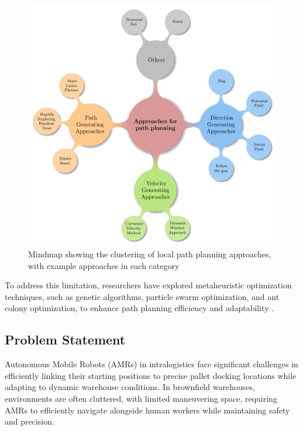 \documentclass{amam}                %
\begin{document}
\begin{figure}
  \centering \includegraphics[width=1.0\linewidth]{eps/Mindmap-OAApproaches.pdf}
  \caption{Mindmap showing the clustering of local path planning approaches, with example approaches in each category}
  \label{mindmap}
\end{figure}








To address this limitation, researchers have explored metaheuristic optimization techniques, such as genetic 
algorithms, particle swarm optimization, and ant colony optimization, to enhance path planning efficiency and adaptability \cite{ref1}.

\subsection{Problem Statement}
Autonomous Mobile Robots (AMRs) in intralogistics face significant challenges in efficiently linking their starting positions to precise pallet docking locations while adapting to dynamic warehouse conditions. In brownfield warehouses, environments are often cluttered, with limited maneuvering space, requiring AMRs to efficiently navigate alongside human workers while maintaining safety and precision.
\end{document}
